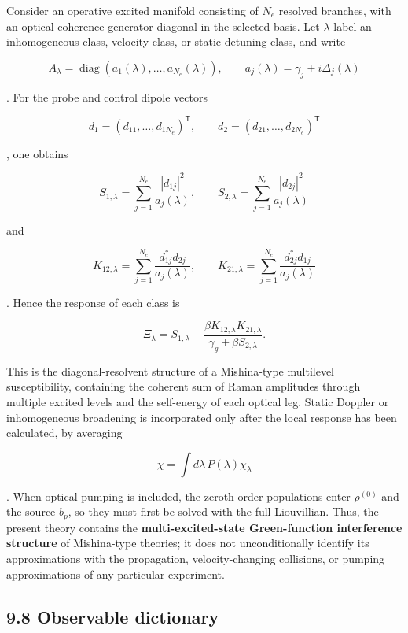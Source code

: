 \documentclass[
  10pt,
  a4paper,
]{article}
\begin{document}
Consider an operative excited manifold consisting of \(N_e\) resolved
branches, with an optical-coherence generator diagonal in the selected
basis. Let \(\lambda\) label an inhomogeneous class, velocity class, or
static detuning class, and write

\[
A_\lambda
=\operatorname{diag}
\left(a_1(\lambda),\ldots,a_{N_e}(\lambda)\right),
\qquad
a_j(\lambda)=\gamma_j+i\Delta_j(\lambda)
\]

. For the probe and control dipole vectors

\[
d_1=(d_{11},\ldots,d_{1N_e})^{\mathsf T},
\qquad
d_2=(d_{21},\ldots,d_{2N_e})^{\mathsf T}
\]

, one obtains

\[
\boxed{
S_{1,\lambda}
=\sum_{j=1}^{N_e}
\frac{|d_{1j}|^2}{a_j(\lambda)}
},
\qquad
\boxed{
S_{2,\lambda}
=\sum_{j=1}^{N_e}
\frac{|d_{2j}|^2}{a_j(\lambda)}
}
\]

and

\[
\boxed{
K_{12,\lambda}
=\sum_{j=1}^{N_e}
\frac{d_{1j}^*d_{2j}}{a_j(\lambda)}
},
\qquad
\boxed{
K_{21,\lambda}
=\sum_{j=1}^{N_e}
\frac{d_{2j}^*d_{1j}}{a_j(\lambda)}
}
\]

. Hence the response of each class is

\[
\boxed{
\Xi_\lambda
=S_{1,\lambda}
-
\frac{\beta K_{12,\lambda}K_{21,\lambda}}
{\gamma_g+\beta S_{2,\lambda}}
}.
\]

This is the diagonal-resolvent structure of a Mishina-type multilevel
susceptibility, containing the coherent sum of Raman amplitudes through
multiple excited levels and the self-energy of each optical leg. Static
Doppler or inhomogeneous broadening is incorporated only after the local
response has been calculated, by averaging

\[
\boxed{
\overline\chi
=\int d\lambda\,P(\lambda)\chi_\lambda
}
\]

. When optical pumping is included, the zeroth-order populations enter
\(\rho^{(0)}\) and the source \(b_p\), so they must first be solved with
the full Liouvillian. Thus, the present theory contains the
\textbf{multi-excited-state Green-function interference structure} of
Mishina-type theories; it does not unconditionally identify its
approximations with the propagation, velocity-changing collisions, or
pumping approximations of any particular experiment.

\subsection{9.8 Observable dictionary}\label{observable-dictionary}
\end{document}
